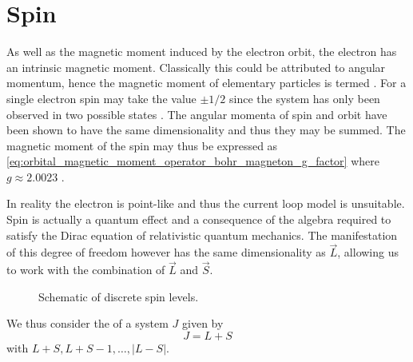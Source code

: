 \section{Spin}
As well as the magnetic moment induced by the electron orbit, the electron has an intrinsic magnetic moment. Classically this could be attributed to angular momentum, hence the magnetic moment of elementary particles is termed . 
For a single electron spin may take the value $\pm 1/2$ since the system has only been observed in two possible states \cite{Gerlach1922}. The angular momenta of spin and orbit have been shown to have the same dimensionality and thus they may be summed. 
The magnetic moment of the spin may thus be expressed as \eqref{eq:orbital_magnetic_moment_operator_bohr_magneton_g_factor} \cite{Povh2002-fj} where $g\approx2.0023$ \cite{electron-g-factor, PhysRevLett.130.071801}. 

\begin{wrapfigure}{l}{0.2\textwidth}%
    \centering%
        
\end{wrapfigure}%

In reality the electron is point-like and thus the current loop model is unsuitable. Spin is actually a quantum effect and a consequence of the algebra required to satisfy the Dirac equation of relativistic quantum mechanics. The manifestation of this degree of freedom however has the same dimensionality as $\vec{L}$, allowing us to work with the combination of $\vec{L}$ and $\vec{S}$. 

\begin{wrapfigure}{r}{0.3\textwidth}%
    \begin{center}
        
  \caption{Schematic of discrete spin levels.}%
\end{center}
\end{wrapfigure}


We thus consider the  of a system $J$ given by 
\begin{equation}
    J = L + S 
    \label{eq:total_angular_momentum}
\end{equation}
with $L+S, L+ S - 1, \dots, |L-S|$. 

